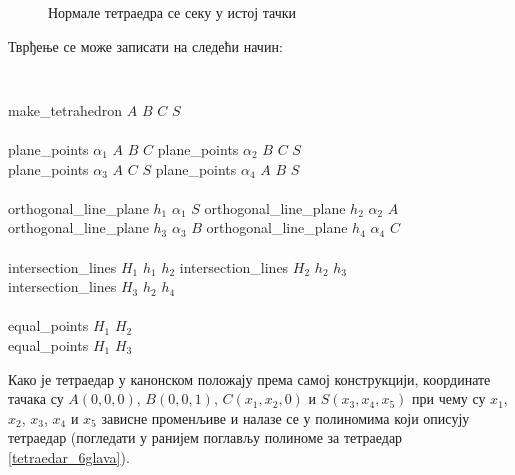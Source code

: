 \begin{figure}[hb]
\begin{center}

\end{center}
\caption{Нормале тетраедра се секу у истој тачки}
\end{figure}

Тврђење се може записати на следећи начин:

\begin{footnotesize}
{\tt
\begin{tabbing}
make\_tetrahedron $A$ $B$ $C$ $S$ \ \ \ \ \ \ \ \ \ \ \ \ \= \\ \\

plane\_points $\alpha_1$ $A$ $B$ $C$ \> plane\_points $\alpha_2$ $B$ $C$ $S$ \\
plane\_points $\alpha_3$ $A$ $C$ $S$ \> plane\_points $\alpha_4$ $A$ $B$ $S$ \\ \\

orthogonal\_line\_plane $h_1$ $\alpha_1$ $S$ \> orthogonal\_line\_plane $h_2$ $\alpha_2$ $A$ \\
orthogonal\_line\_plane $h_3$ $\alpha_3$ $B$ \> orthogonal\_line\_plane $h_4$ $\alpha_4$ $C$ \\ \\

intersection\_lines $H_1$ $h_1$ $h_2$ \> intersection\_lines $H_2$ $h_2$ $h_3$ \\
intersection\_lines $H_3$ $h_2$ $h_4$ \\ \\

equal\_points $H_1$ $H_2$ \\
equal\_points $H_1$ $H_3$ \\
\end{tabbing}
}
\end{footnotesize}

Како је тетраедар у канонском положају према самој конструкцији,
координате тачака су $A(0, 0, 0)$, $B(0, 0, 1)$, $C(x_1, x_2, 0)$ и
$S(x_3, x_4, x_5)$ при чему су $x_1$, $x_2$, $x_3$, $x_4$ и $x_5$
зависне променљиве и налазе се у полиномима који описују тетраедар
(погледати у ранијем поглављу полиноме за тетраедар
\ref{tetraedar_6glava}).

